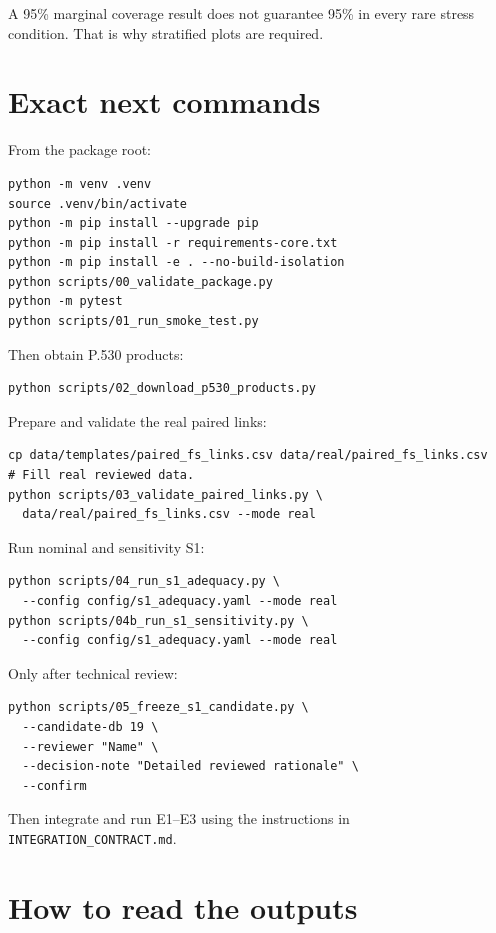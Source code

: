 \documentclass[11pt]{article}
\begin{document}
A 95\% marginal coverage result does not guarantee 95\% in every rare stress condition. That is why stratified plots are required.

\section{Exact next commands}

From the package root:

\begin{verbatim}
python -m venv .venv
source .venv/bin/activate
python -m pip install --upgrade pip
python -m pip install -r requirements-core.txt
python -m pip install -e . --no-build-isolation
python scripts/00_validate_package.py
python -m pytest
python scripts/01_run_smoke_test.py
\end{verbatim}

Then obtain P.530 products:

\begin{verbatim}
python scripts/02_download_p530_products.py
\end{verbatim}

Prepare and validate the real paired links:

\begin{verbatim}
cp data/templates/paired_fs_links.csv data/real/paired_fs_links.csv
# Fill real reviewed data.
python scripts/03_validate_paired_links.py \
  data/real/paired_fs_links.csv --mode real
\end{verbatim}

Run nominal and sensitivity S1:

\begin{verbatim}
python scripts/04_run_s1_adequacy.py \
  --config config/s1_adequacy.yaml --mode real
python scripts/04b_run_s1_sensitivity.py \
  --config config/s1_adequacy.yaml --mode real
\end{verbatim}

Only after technical review:

\begin{verbatim}
python scripts/05_freeze_s1_candidate.py \
  --candidate-db 19 \
  --reviewer "Name" \
  --decision-note "Detailed reviewed rationale" \
  --confirm
\end{verbatim}

Then integrate and run E1--E3 using the instructions in \texttt{INTEGRATION\_CONTRACT.md}.

\section{How to read the outputs}
\end{document}
